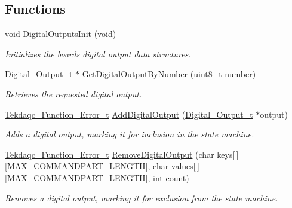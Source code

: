 \subsection*{Functions}
\begin{DoxyCompactItemize}
\item 
void \hyperlink{group__digital__output_gaf266fa3481b0804611eb19719346b172}{Digital\-Outputs\-Init} (void)
\begin{DoxyCompactList}\small\item\em Initializes the boards digital output data structures. \end{DoxyCompactList}\item 
\hyperlink{struct_digital___output__t}{Digital\-\_\-\-Output\-\_\-t} $\ast$ \hyperlink{group__digital__output_ga392c891d1dfd4610ea0e1ef67f76872b}{Get\-Digital\-Output\-By\-Number} (uint8\-\_\-t number)
\begin{DoxyCompactList}\small\item\em Retrieves the requested digital output. \end{DoxyCompactList}\item 
\hyperlink{group__tekdaqc__error_ga19df05d919ecca7a7501b35ae9080a32}{Tekdaqc\-\_\-\-Function\-\_\-\-Error\-\_\-t} \hyperlink{group__digital__output_gaeac54f24092eff564148db6cd346f153}{Add\-Digital\-Output} (\hyperlink{struct_digital___output__t}{Digital\-\_\-\-Output\-\_\-t} $\ast$output)
\begin{DoxyCompactList}\small\item\em Adds a digital output, marking it for inclusion in the state machine. \end{DoxyCompactList}\item 
\hyperlink{group__tekdaqc__error_ga19df05d919ecca7a7501b35ae9080a32}{Tekdaqc\-\_\-\-Function\-\_\-\-Error\-\_\-t} \hyperlink{group__digital__output_ga3ae9f85352ddfe3c29046f9d3b068d64}{Remove\-Digital\-Output} (char keys\mbox{[}$\,$\mbox{]}\mbox{[}\hyperlink{group__command__parser_ga6147771b5547853f33eb838895e3d5a2}{M\-A\-X\-\_\-\-C\-O\-M\-M\-A\-N\-D\-P\-A\-R\-T\-\_\-\-L\-E\-N\-G\-T\-H}\mbox{]}, char values\mbox{[}$\,$\mbox{]}\mbox{[}\hyperlink{group__command__parser_ga6147771b5547853f33eb838895e3d5a2}{M\-A\-X\-\_\-\-C\-O\-M\-M\-A\-N\-D\-P\-A\-R\-T\-\_\-\-L\-E\-N\-G\-T\-H}\mbox{]}, int count)
\begin{DoxyCompactList}\small\item\em Removes a digital output, marking it for exclusion from the state machine. \end{DoxyCompactList}\item 

\end{DoxyCompactItemize}
